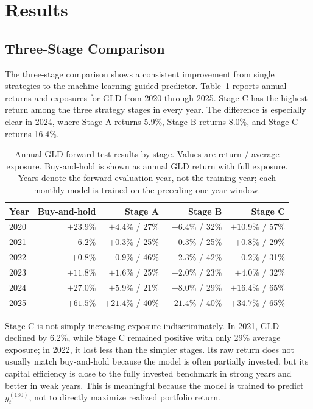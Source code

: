 \documentclass[11pt, letterpaper]{article}
\begin{document}
\section{Results}

\subsection{Three-Stage Comparison}

The three-stage comparison shows a consistent improvement from single strategies to the machine-learning-guided predictor. Table~\ref{tab:stage-results} reports annual returns and exposures for GLD from 2020 through 2025. Stage C has the highest return among the three strategy stages in every year. The difference is especially clear in 2024, where Stage A returns 5.9\%, Stage B returns 8.0\%, and Stage C returns 16.4\%.

\begin{table}[htbp]
\centering
\caption{Annual GLD forward-test results by stage. Values are return / average exposure. Buy-and-hold is shown as annual GLD return with full exposure. Years denote the forward evaluation year, not the training year; each monthly model is trained on the preceding one-year window.}
\label{tab:stage-results}
\small
\begin{tabular}{lrrrr}
\toprule
Year & Buy-and-hold & Stage A & Stage B & Stage C \\
\midrule
2020 & $+23.9\%$ & $+4.4\%$ / 27\% & $+6.4\%$ / 32\% & $\mathbf{+10.9\%}$ / 57\% \\
2021 & $-6.2\%$  & $+0.3\%$ / 25\% & $+0.3\%$ / 25\% & $\mathbf{+0.8\%}$ / 29\% \\
2022 & $+0.8\%$  & $-0.9\%$ / 46\% & $-2.3\%$ / 42\% & $\mathbf{-0.2\%}$ / 31\% \\
2023 & $+11.8\%$ & $+1.6\%$ / 25\% & $+2.0\%$ / 23\% & $\mathbf{+4.0\%}$ / 32\% \\
2024 & $+27.0\%$ & $+5.9\%$ / 21\% & $+8.0\%$ / 29\% & $\mathbf{+16.4\%}$ / 65\% \\
2025 & $+61.5\%$ & $+21.4\%$ / 40\% & $+21.4\%$ / 40\% & $\mathbf{+34.7\%}$ / 65\% \\
\bottomrule
\end{tabular}
\end{table}

Stage C is not simply increasing exposure indiscriminately. In 2021, GLD declined by 6.2\%, while Stage C remained positive with only 29\% average exposure; in 2022, it lost less than the simpler stages. Its raw return does not usually match buy-and-hold because the model is often partially invested, but its capital efficiency is close to the fully invested benchmark in strong years and better in weak years. This is meaningful because the model is trained to predict $y_t^{(130)}$, not to directly maximize realized portfolio return.
\end{document}
